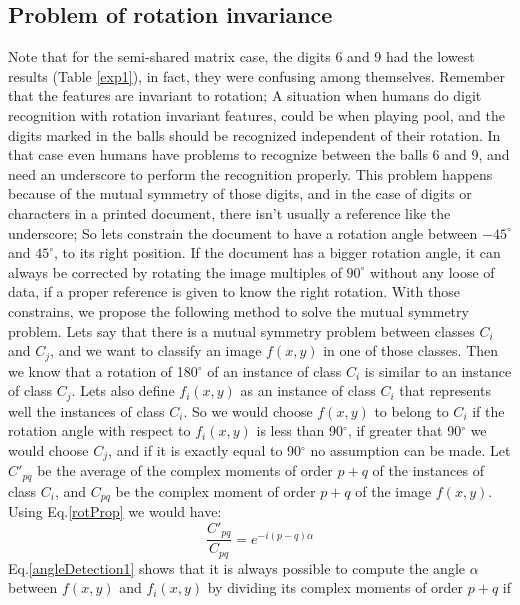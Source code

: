 \documentclass[10pt,journal]{IEEEtran}
\begin{document}
	\subsection{Problem of rotation invariance}
	Note that for the semi-shared matrix case, the digits 6 and 9 had the lowest results
	(Table \ref{exp1}), in fact, they were confusing among themselves. Remember that the
	features are invariant to rotation; A situation when humans do digit recognition with
	rotation invariant features, could be when playing pool, and the digits marked in the
	balls should be recognized independent of their rotation. In that case even humans have
	problems to recognize between the balls 6 and 9, and need an underscore to perform the
	recognition properly. This problem happens because of the mutual symmetry of those
	digits, and in the case of digits or characters in a printed document, there isn't usually
	a reference like the underscore; So lets constrain the document to have a rotation angle
	between $-45^\circ$ and $45^\circ$, to its right position. If the document has a bigger
	rotation angle, it can always be corrected by rotating the image multiples of $90^\circ$
	without any loose of data, if a proper reference is given to know the right rotation. \newline
	With those constrains, we propose the following method to solve the mutual symmetry problem.
	Lets say that there is a mutual symmetry problem between classes $C_i$ and $C_j$, and we
	want to classify an image $f(x,y)$ in one of those classes. Then we know that a rotation of
	180$^\circ$ of an instance of class $C_i$ is similar to an instance of class $C_j$. Lets
	also define $f_i(x,y)$ as an instance of class $C_i$ that represents well the instances
	of class $C_i$. So we would choose $f(x,y)$ to belong to $C_i$ if the rotation angle with
	respect to $f_i(x,y)$ is less than 90$^\circ$, if greater that 90$^\circ$ we would choose
	$C_j$, and if it is exactly equal to 90$^\circ$ no assumption can be made. \newline
	Let $C'_{pq}$ be the average of the complex moments of order $p+q$ of the instances of
	class $C_i$, and $C_{pq}$ be the complex moment of order $p+q$ of the image $f(x,y)$.
	Using Eq.\eqref{rotProp} we would have:
	\begin{equation}\label{angleDetection1}
		\frac{C'_{pq}}{C_{pq}} = e^{-i(p-q)\alpha}
	\end{equation}
	Eq.\eqref{angleDetection1} shows that it is always possible to compute the angle $\alpha$ 
	between	$f(x,y)$ and $f_i(x,y)$ by dividing its complex moments of order $p+q$ if 
\end{document}

